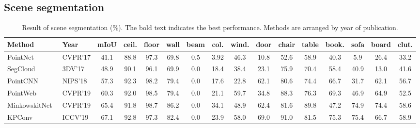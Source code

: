 \documentclass[a4paper,fleqn]{cas-dc}
\begin{document}
\subsection{Scene segmentation}
\label{sec: scene_seg}
\begin{table*}[t]
\centering
    \caption{Result of scene segmentation (\%). The bold text indicates the best performance. Methods are arranged by year of publication.}
\begin{tabular*}{\tblwidth}{L|L|C|CCCCCCCCCCCCC}
\toprule
        Method
        & Year
        & mIoU
        & ceil.
        & floor
        & wall
        & beam
        & col.
        & wind.
        & door
        & chair
        & table
        & book.
        & sofa
        & board
        & clut.
        \\
\midrule
        PointNet~\cite{qi2017pointnet}
        & CVPR'17
        & 41.1
        & 88.8
        & 97.3
        & 69.8
        & 0.5
        & 3.92
        & 46.3
        & 10.8
        & 52.6
        & 58.9
        & 40.3
        & 5.9
        & 26.4
        & 33.2
        \\

        SegCloud~\cite{tchapmi2017segcloud}
        & 3DV'17
        & 48.9
        & 90.1
        & 96.1
        & 69.9
        & 0.0
        & 18.4
        & 38.4
        & 23.1
        & 75.9
        & 70.4
        & 58.4
        & 40.9
        & 13.0
        & 41.6
        \\
        PointCNN~\cite{li2018pointcnn}
        & NIPS'18
        &57.3
        & 92.3
        & 98.2
        & 79.4
        & 0.0
        & 17.6
        & 22.8
        & 62.1
        & 80.6
        & 74.4
        & 66.7 
        & 31.7
        & 62.1
        & 56.7
        \\
        PointWeb~\cite{zhao2019pointweb}
        & CVPR'19
        & 60.3 
        & 92.0
        & 98.5
        & 79.4
        & 0.0
        & 21.1
        & 59.7
        & 34.8
        & 88.3
        & 76.3
        & 69.3
        & 46.9
        & 64.9
        & 52.5
        \\
        MinkowskitNet~\cite{choy20194d}
        & CVPR'19
        & 65.4
        & 91.8
        & 98.7
        & 86.2
        & 0.0
        & 34.1
        & 48.9
        & 62.4
        & 81.6
        & 89.8
        & 47.2
        & 74.9
        & 74.4
        & 58.6
        \\


KPConv~\cite{thomas2019kpconv}
        & ICCV'19
        & 67.1
        & 92.8
        & 97.3
        & 82.4
        & 0.0
        & 23.9
        & 58.0
        & 69.0
        & 91.0
& 81.5
        & 75.3
& 75.4
        & 66.7
        & 58.9
        \\







\end{tabular*}
\end{table*}
\end{document}

